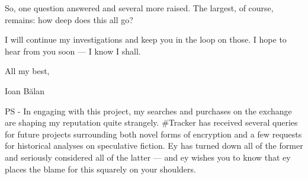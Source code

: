 So, one question answered and several more raised. The largest, of course, remains: how deep does this all go?

I will continue my investigations and keep you in the loop on those. I hope to hear from you soon — I know I shall.

All my best,

Ioan Bălan

PS - In engaging with this project, my searches and purchases on the exchange are shaping my reputation quite strangely. \#Tracker has received several queries for future projects surrounding both novel forms of encryption and a few requests for historical analyses on speculative fiction. Ey has turned down all of the former and seriously considered all of the latter — and ey wishes you to know that ey places the blame for this squarely on your shoulders.
